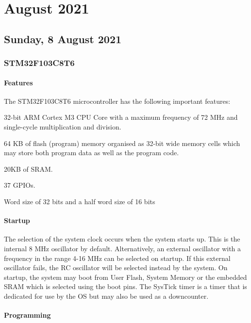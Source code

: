 \chapter[2021 August]{August 2021}

\section[2021/08/08]{Sunday, 8 August 2021}

\subsection{STM32F103C8T6}

\subsubsection{Features}

The STM32F103C8T6 microcontroller has the following important features:

\begin{compactitem}
	\item 32-bit ARM Cortex M3 CPU Core with a maximum frequency of 72 MHz and single-cycle multiplication and division.
	\item 64 KB of flash (program) memory organised as 32-bit wide memory cells which may store both program data as well as the program code.
	\item 20KB of SRAM.
	\item 37 GPIOs.
	\item Word size of 32 bits and a half word size of 16 bits
\end{compactitem}

\subsubsection{Startup}

The selection of the system clock occurs when the system starts up. This is the internal 8 MHz oscillator by default. Alternatively, an external oscillator with a frequency in the range 4-16 MHz can be selected on startup. If this external oscillator fails, the RC oscillator will be selected instead by the system. On startup, the system may boot from User Flash, System Memory or the embedded SRAM which is selected using the boot pins. The SysTick timer is a timer that is dedicated for use by the \ac{OS} but may also be used as a downcounter.

\subsubsection{Programming}

